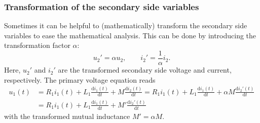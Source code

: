 \begin{frame}
	\frametitle{Transformation of the secondary side variables}
		Sometimes it can be helpful to (mathematically) transform the secondary side variables to ease the mathematical analysis. This can be done by introducing the transformation factor $\alpha$:
		\begin{equation}
			u_2' = \alpha u_2, \qquad i_2' = \frac{1}{\alpha} i_2.
		\end{equation}
		\pause
		Here, $u_2'$ and $i_2'$ are the transformed secondary side voltage and current, respectively. \pause The primary voltage equation reads
		\begin{equation}
			\begin{split}
			u_1(t) &= R_1 i_1(t) + L_1 \frac{\mathrm{d}i_1(t)}{\mathrm{d}t} + M \frac{\mathrm{d}i_2(t)}{\mathrm{d}t}  = R_1 i_1 (t)+ L_1 \frac{\mathrm{d}i_1(t)}{\mathrm{d}t}  + \alpha M \frac{\mathrm{d}i_2'(t)}{\mathrm{d}t}  \\&= R_1 i_1(t) + L_1 \frac{\mathrm{d}i_1(t)}{\mathrm{d}t} + M' \frac{\mathrm{d}i_2'(t)}{\mathrm{d}t}
		\end{split}
		\end{equation}
		with the transformed mutual inductance $M' = \alpha M$. 
\end{frame}

